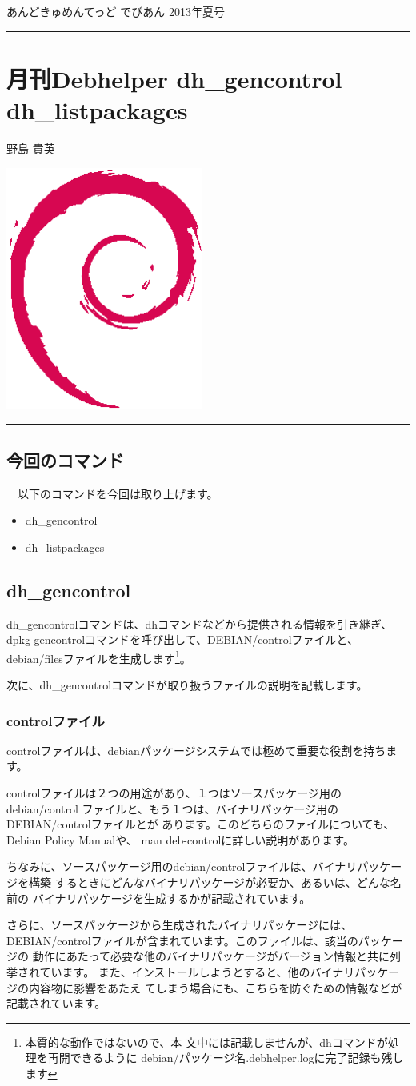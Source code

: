 \documentclass[mingoth,a4paper]{jsarticle}
\renewcommand{\dancersection}[2]{%
\newpage
あんどきゅめんてっど でびあん 2013年夏号
%
\vspace{0.1mm}\\
{\color{dancerdarkblue}\rule{\hsize}{2mm}}

%
%
\begin{minipage}[t]{0.6\hsize}
\color{dancerdarkblue}
\vspace{1cm}
\section{#1}
\hfill{}#2\\
\end{minipage}
\begin{minipage}[t]{0.4\hsize}
\vspace{-2cm}
\hfill{}\includegraphics[height=8cm]{image200502/openlogo-nd.eps}\\
\vspace{-5cm}
\end{minipage}
%
{\color{dancerlightblue}\rule{0.66\hsize}{2mm}}
%
\vspace{2cm}
}
\begin{document}
\dancersection{月刊Debhelper dh\_gencontrol dh\_listpackages}{野島 貴英}


\subsection{今回のコマンド}

　以下のコマンドを今回は取り上げます。

\begin{itemize}
\item dh\_gencontrol
\item dh\_listpackages
\end{itemize}

\subsection{dh\_gencontrol}

 dh\_gencontrolコマンドは、dhコマンドなどから提供される情報を引き継ぎ、
dpkg-gencontrolコマンドを呼び出して、DEBIAN/controlファイルと、
debian/filesファイルを生成します\footnote{本質的な動作ではないので、本
文中には記載しませんが、dhコマンドが処理を再開できるように
debian/パッケージ名.debhelper.logに完了記録も残します}。

 次に、dh\_gencontrolコマンドが取り扱うファイルの説明を記載します。

\subsubsection{controlファイル}

 controlファイルは、debianパッケージシステムでは極めて重要な役割を持ちます。

 controlファイルは２つの用途があり、１つはソースパッケージ用のdebian/control
ファイルと、もう１つは、バイナリパッケージ用のDEBIAN/controlファイルとが
あります。このどちらのファイルについても、Debian Policy Manual\cite{debpolicy}や、
man deb-controlに詳しい説明があります。
 
 ちなみに、ソースパッケージ用のdebian/controlファイルは、バイナリパッケージを構築
するときにどんなバイナリパッケージが必要か、あるいは、どんな名前の
バイナリパッケージを生成するかが記載されています。

 さらに、ソースパッケージから生成されたバイナリパッケージには、
DEBIAN/controlファイルが含まれています。このファイルは、該当のパッケージの
動作にあたって必要な他のバイナリパッケージがバージョン情報と共に列挙されています。
また、インストールしようとすると、他のバイナリパッケージの内容物に影響をあたえ
てしまう場合にも、こちらを防ぐための情報などが記載されています。
\end{document}
